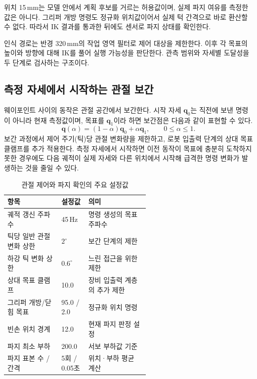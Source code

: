 위치 15\,mm는 모델 안에서 계획 후보를 거르는 허용값이며, 실제 파지 여유를 측정한 값은 아니다. 그리퍼 개방 명령도 정규화 위치값이어서 실제 턱 간격으로 바로 환산할 수 없다. 따라서 IK 결과를 통과한 뒤에도 센서로 파지 상태를 확인한다.

인식 경로는 반경 320\,mm의 작업 영역 필터로 제어 대상을 제한한다. 이후 각 목표의 높이와 방향에 대해 IK를 풀어 실행 가능성을 판단한다. 관측 범위와 자세별 도달성을 두 단계로 검사하는 구조이다.

\subsection{측정 자세에서 시작하는 관절 보간}
웨이포인트 사이의 동작은 관절 공간에서 보간한다. 시작 자세 $\boldsymbol{q}_0$는 직전에 보낸 명령이 아니라 현재 측정값이며, 목표를 $\boldsymbol{q}_1$이라 하면 보간점은 다음과 같이 표현할 수 있다.
\begin{equation}
\boldsymbol{q}(\alpha)=(1-\alpha)\boldsymbol{q}_0+\alpha\boldsymbol{q}_1,
\qquad 0\leq\alpha\leq1.
\end{equation}
보간 과정에서 제어 주기(틱)당 관절 변화량을 제한하고, 로봇 입출력 단계의 상대 목표 클램프를 추가 적용한다. 측정 자세에서 시작하면 이전 동작이 목표에 충분히 도착하지 못한 경우에도 다음 궤적이 실제 자세와 다른 위치에서 시작해 급격한 명령 변화가 발생하는 것을 줄일 수 있다.

\begin{table}[htbp]
\centering
\caption{관절 제어와 파지 확인의 주요 설정값}
\begin{tabularx}{\linewidth}{@{}L{0.38\linewidth}L{0.19\linewidth}Y@{}}
\toprule
항목 & 설정값 & 의미 \\
\midrule
궤적 갱신 주파수 & 45\,Hz & 명령 생성의 목표 주파수 \\
틱당 일반 관절 변화 상한 & $2^\circ$ & 보간 단계의 제한 \\
하강 틱 변화 상한 & $0.6^\circ$ & 느린 접근을 위한 제한 \\
상대 목표 클램프 & 10.0 & 장비 입출력 계층의 추가 제한 \\
그리퍼 개방/닫힘 목표 & 95.0 / 2.0 & 정규화 위치 명령 \\
빈손 위치 경계 & 12.0 & 현재 파지 판정 설정 \\
파지 최소 부하 & 200.0 & 서보 부하값 기준 \\
파지 표본 수 / 간격 & 5회 / 0.05초 & 위치·부하 평균 계산 \\
\bottomrule
\end{tabularx}
\end{table}

